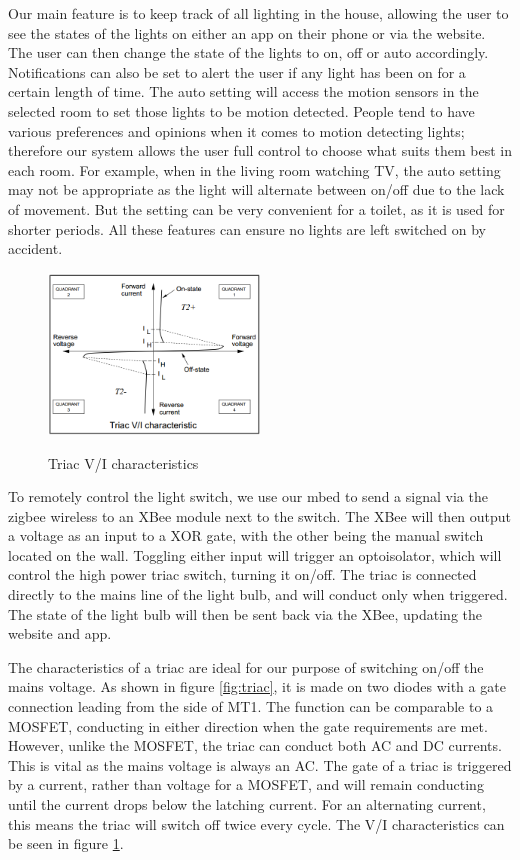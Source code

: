 \documentclass[10.5pt,a4paper,twoside]{report}   %
\begin{document}
Our main feature is to keep track of all lighting in the house, allowing the user to see the states of the lights on either an app on their phone or via the website. The user can then change the state of the lights to on, off or auto accordingly. Notifications can also be set to alert the user if any light has been on for a certain length of time. The auto setting will access the motion sensors in the selected room to set those lights to be motion detected. People tend to have various preferences and opinions when it comes to motion detecting lights; therefore our system allows the user full control to choose what suits them best in each room. For example, when in the living room watching TV, the auto setting may not be appropriate as the light will alternate between on/off due to the lack of movement. But the setting can be very convenient for a toilet, as it is used for shorter periods. All these features can ensure no lights are left switched on by accident. 

\begin{figure}[h!]
  \vspace{-10pt}
  \caption{Triac V/I characteristics}
  \centering
    \includegraphics[width=0.5\textwidth]{images/triac_vi.png}
\label{fig:triacvi}
  \vspace{-10pt}
\end{figure}

To remotely control the light switch, we use our mbed to send a signal via the zigbee wireless to an XBee module next to the switch. The XBee will then output a voltage as an input to a XOR gate, with the other being the manual switch located on the wall. Toggling either input will trigger an optoisolator, which will control the high power triac switch, turning it on/off. The triac is connected directly to the mains line of the light bulb, and will conduct only when triggered. The state of the light bulb will then be sent back via the XBee, updating the website and app. 



The characteristics of a triac are ideal for our purpose of switching on/off the mains voltage. As shown in figure \ref{fig:triac}, it is made on two diodes with a gate connection leading from the side of MT1. The function can be comparable to a MOSFET, conducting in either direction when the gate requirements are met. However, unlike the MOSFET, the triac can conduct both AC and DC currents. This is vital as the mains voltage is always an AC. The gate of a triac is triggered by a current, rather than voltage for a MOSFET, and will remain conducting until the current drops below the latching current. For an alternating current, this means the triac will switch off twice every cycle. The V/I characteristics can be seen in figure \ref{fig:triacvi}. 
\end{document}
